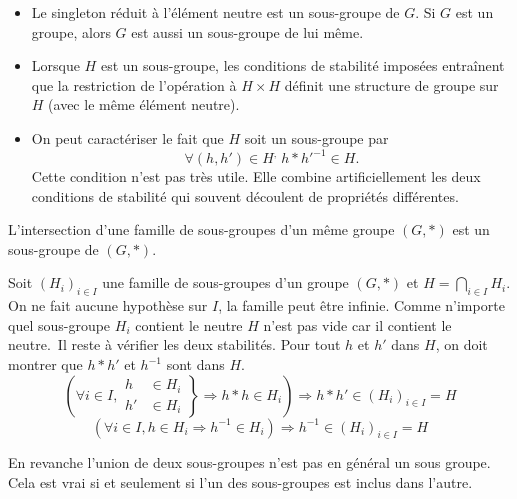 \begin{rems}
\begin{itemize}
  \item Le singleton réduit à l'élément neutre est un sous-groupe de $G$. Si $G$ est un groupe, alors $G$ est aussi un sous-groupe de lui même.
  \item Lorsque $H$ est un sous-groupe, les conditions de stabilité imposées entraînent que la restriction de l'opération à $H\times H$ définit une structure de groupe sur $H$ (avec le même élément neutre).
  \item On peut caractériser le fait que $H$ soit un sous-groupe par 
\begin{displaymath}
  \forall(h,h')\in H^,\; h * h'^{-1} \in H .
\end{displaymath}
Cette condition n'est pas très utile. Elle combine artificiellement les deux conditions de stabilité qui souvent découlent de propriétés différentes.
\end{itemize}
\end{rems}

\begin{prop}
 L'intersection d'une famille de sous-groupes d'un même groupe $(G,*)$ est un sous-groupe de $(G,*)$.
\end{prop}
\begin{demo}
  Soit $\left( H_i\right)_{i\in I}$ une famille de sous-groupes d'un groupe $(G,*)$ et $H = \bigcap_{i\in I}H_i$. On ne fait aucune hypothèse sur $I$, la famille peut être infinie. Comme n'importe quel sous-groupe $H_i$ contient le neutre $H$ n'est pas vide car il contient le neutre.\  Il reste à vérifier les deux stabilités. Pour tout $h$ et $h'$ dans $H$, on doit montrer que $h*h'$ et $h^{-1}$ sont dans $H$.
\begin{displaymath}
\left( \forall i\in I,
\left. 
\begin{aligned}
  h &\in H_i \\ h' &\in H_i
\end{aligned}
\right\rbrace \Rightarrow h*h \in H_i 
\right) \Rightarrow h*h' \in \left( H_i\right)_{i\in I} = H
\end{displaymath}
\begin{displaymath}
  \left( \forall i \in I, h\in H_i \Rightarrow h^{-1}\in H_i \right) \Rightarrow h^{-1} \in \left( H_i\right)_{i\in I} = H
\end{displaymath}
\end{demo}

\begin{rem}
 En revanche l'union de deux sous-groupes n'est pas en général un sous groupe. Cela est vrai si et seulement si l'un des sous-groupes est inclus dans l'autre. 
\end{rem}

